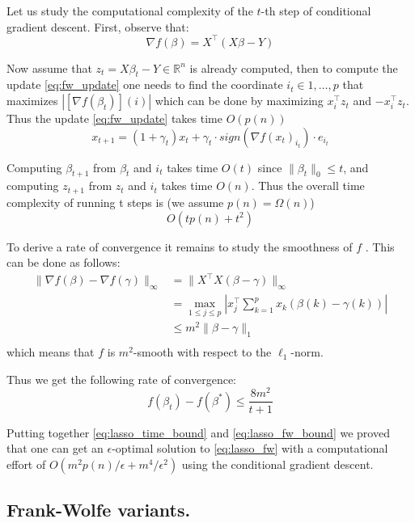 Let us study the computational complexity of the $t$-th step of
conditional gradient descent. First, observe that:
\begin{equation}
\nabla f (\beta)=X^\top (X\beta-Y) \nonumber
\end{equation}

Now assume that $z_t=X \beta_t - Y \in \mathbb{R}^n$ is already computed, then to compute the update \ref{eq:fw_update} one needs to find  the coordinate $i_t \in 1,\ldots,p$ that maximizes $| [\nabla f(\beta_t)](i) |$ which can be done by maximizing $x_i^\top z_t$ and $-x_i^\top z_t$. Thus the update \ref{eq:fw_update} takes time $O(p(n))$
\begin{equation}
x_{t+1} = (1+\gamma_t) x_t + \gamma_t \cdot sign( \nabla f(x_t)_{i_t} ) \cdot e_{i_{t}}
\end{equation}

Computing $\beta_{t+1}$ from $\beta_t$ and $i_t$ takes time $O(t)$ since $\|\beta_t \|_0 \leq t$, and computing $z_{t+1}$ from $z_t$ and $i_t$ takes time $O(n)$. Thus the overall time complexity of running t steps is (we assume $p(n) =\Omega(n)$)
\begin{equation} \label{eq:lasso_time_bound}
O(tp(n) + t^2 )
\end{equation}

To derive a rate of convergence it remains to study the smoothness
of $f$ . This can be done as follows:
\begin{align}
\| \nabla f(\beta) - \nabla f(\gamma) \|_{\infty} & = \| X^\top X(\beta-\gamma) \|_{\infty} \nonumber \\
& = \max_{1 \leq j \leq p} | x_j^\top \sum_{k=1}^{p} x_k(\beta(k)-\gamma(k)) | \nonumber \\
& \leq m^2 \| \beta-\gamma \|_1 \nonumber \\
\end{align}
which means that $f$ is $m^2$-smooth with respect to the $\ell_1$-norm.

Thus we get the following rate of convergence:
\begin{equation} \label{eq:lasso_fw_bound}
f(\beta_t)-f(\beta^*) \leq \frac{8 m^2}{t+1}
\end{equation}

Putting together \ref{eq:lasso_time_bound} and \ref{eq:lasso_fw_bound} we proved that one can get an $\epsilon$-optimal solution to \ref{eq:lasso_fw} with a computational effort of $O(m^2 p(n)/\epsilon+m^4/\epsilon^2)$ using the conditional gradient descent.

\subsection{Frank-Wolfe variants.}

